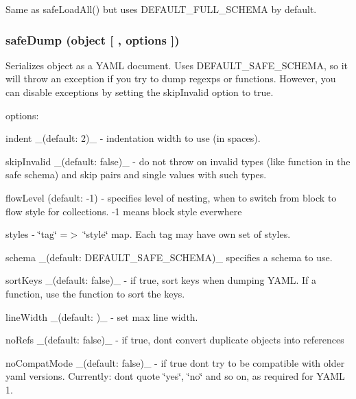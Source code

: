 Same as {\ttfamily safe\+Load\+All()} but uses {\ttfamily D\+E\+F\+A\+U\+L\+T\+\_\+\+F\+U\+L\+L\+\_\+\+S\+C\+H\+E\+MA} by default.

\subsubsection*{safe\+Dump (object \mbox{[} , options \mbox{]})}

Serializes {\ttfamily object} as a Y\+A\+ML document. Uses {\ttfamily D\+E\+F\+A\+U\+L\+T\+\_\+\+S\+A\+F\+E\+\_\+\+S\+C\+H\+E\+MA}, so it will throw an exception if you try to dump regexps or functions. However, you can disable exceptions by setting the {\ttfamily skip\+Invalid} option to {\ttfamily true}.

options\+:


\begin{DoxyItemize}
\item {\ttfamily indent} \+\_\+(default\+: 2)\+\_\+ -\/ indentation width to use (in spaces).
\item {\ttfamily skip\+Invalid} \+\_\+(default\+: false)\+\_\+ -\/ do not throw on invalid types (like function in the safe schema) and skip pairs and single values with such types.
\item {\ttfamily flow\+Level} (default\+: -\/1) -\/ specifies level of nesting, when to switch from block to flow style for collections. -\/1 means block style everwhere
\item {\ttfamily styles} -\/ \char`\"{}tag\char`\"{} =$>$ \char`\"{}style\char`\"{} map. Each tag may have own set of styles.
\item {\ttfamily schema} \+\_\+(default\+: {\ttfamily D\+E\+F\+A\+U\+L\+T\+\_\+\+S\+A\+F\+E\+\_\+\+S\+C\+H\+E\+MA})\+\_\+ specifies a schema to use.
\item {\ttfamily sort\+Keys} \+\_\+(default\+: {\ttfamily false})\+\_\+ -\/ if {\ttfamily true}, sort keys when dumping Y\+A\+ML. If a function, use the function to sort the keys.
\item {\ttfamily line\+Width} \+\_\+(default\+: {})\+\_\+ -\/ set max line width.
\item {\ttfamily no\+Refs} \+\_\+(default\+: {\ttfamily false})\+\_\+ -\/ if {\ttfamily true}, don\textquotesingle{}t convert duplicate objects into references
\item {\ttfamily no\+Compat\+Mode} \+\_\+(default\+: {\ttfamily false})\+\_\+ -\/ if {\ttfamily true} don\textquotesingle{}t try to be compatible with older yaml versions. Currently\+: don\textquotesingle{}t quote \char`\"{}yes\char`\"{}, \char`\"{}no\char`\"{} and so on, as required for Y\+A\+ML 1.
\end{DoxyItemize}

